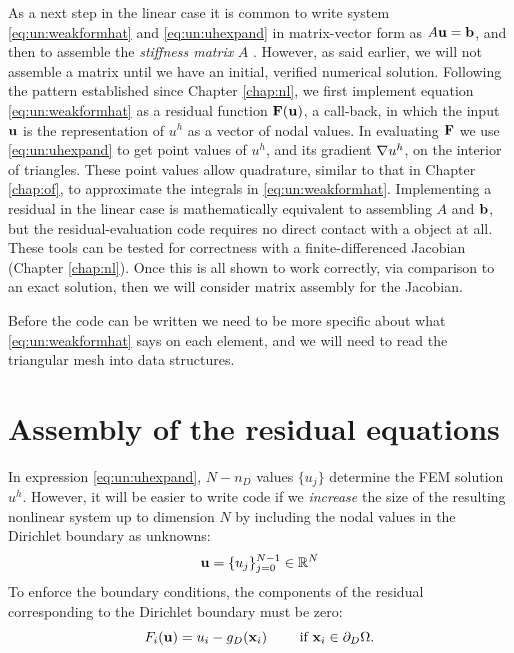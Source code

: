 As a next step in the linear case it is common to write system \eqref{eq:un:weakformhat} and \eqref{eq:un:uhexpand} in matrix-vector form as $A \mathbf{u} = \mathbf{b}$, and then to assemble the \emph{stiffness matrix} $A$ \citep{Elmanetal2005}.  However, as said earlier, we will not assemble a matrix until we have an initial, verified numerical solution.  Following the pattern established since Chapter \ref{chap:nl}, we first implement equation \eqref{eq:un:weakformhat} as a residual function $\mathbf{F}(\mathbf{u})$, a \PETSc \pSNES call-back, in which the input $\mathbf{u}$ is the representation of $u^h$ as a vector of nodal values.  In evaluating $\mathbf{F}$ we use \eqref{eq:un:uhexpand} to get point values of $u^h$, and its gradient $\nabla u^h$, on the interior of triangles.  These point values allow quadrature, similar to that in Chapter \ref{chap:of}, to approximate the integrals in \eqref{eq:un:weakformhat}.  Implementing a residual in the linear case is mathematically equivalent to assembling $A$ and $\mathbf{b}$, but the residual-evaluation code requires no direct contact with a \PETSc \pMat object at all.  These tools can be tested for correctness with a finite-differenced Jacobian (Chapter \ref{chap:nl}).  Once this is all shown to work correctly, via comparison to an exact solution, then we will consider matrix assembly for the Jacobian.

Before the code can be written we need to be more specific about what \eqref{eq:un:weakformhat} says on each element, and we will need to read the triangular mesh into \PETSc data structures.


\section{Assembly of the residual equations}

In expression \eqref{eq:un:uhexpand}, $N-n_D$ values $\{u_j\}$ determine the FEM solution $u^h$.  However, it will be easier to write code if we \emph{increase} the size of the resulting nonlinear system up to dimension $N$ by including the nodal values in the Dirichlet boundary as unknowns:
\begin{equation}
\mathbf{u} = \{u_j\}_{j=0}^{N-1} \in \mathbb{R}^N  \label{eq:un:unknowns}
\end{equation}
To enforce the boundary conditions, the components of the residual corresponding to the Dirichlet boundary must be zero:
\begin{equation}
F_i(\mathbf{u}) = u_i - g_D(\mathbf{x}_i) \qquad \text{ if } \mathbf{x}_i \in \partial_D\Omega.  \label{eq:un:dirichletresiduals}
\end{equation}

